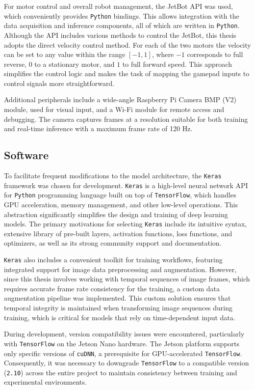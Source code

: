 For motor control and overall robot management, the JetBot API was used, which conveniently provides \texttt{Python} bindings. This allows integration with the data acquisition and inference components, all of which are written in \texttt{Python}. Although the API includes various methods to control the JetBot, this thesis adopts the direct velocity control method. For each of the two motors the velocity can be set to any value within the range \([-1, 1]\), where \(-1\) corresponds to full reverse, \(0\) to a stationary motor, and \(1\) to full forward speed. This approach simplifies the control logic and makes the task of mapping the gamepad inputs to control signals more straightforward.

Additional peripherals include a wide-angle Raspberry Pi Camera BMP (V2) module, used for visual input, and a Wi-Fi module for remote access and debugging. The camera captures frames at a resolution suitable for both training and real-time inference with a maximum frame rate of 120 Hz.

\subsection{Software}

To facilitate frequent modifications to the model architecture, the \texttt{Keras} framework was chosen for development. \texttt{Keras} is a high-level neural network API for \texttt{Python} programming language built on top of \texttt{TensorFlow}, which handles GPU acceleration, memory management, and other low-level operations. This abstraction significantly simplifies the design and training of deep learning models. The primary motivations for selecting \texttt{Keras} include its intuitive syntax, extensive library of pre-built layers, activation functions, loss functions, and optimizers, as well as its strong community support and documentation.

\texttt{Keras} also includes a convenient toolkit for training workflows, featuring integrated support for image data preprocessing and augmentation. However, since this thesis involves working with temporal sequences of image frames, which requires accurate frame rate consistency for the training, a custom data augmentation pipeline was implemented. This custom solution ensures that temporal integrity is maintained when transforming image sequences during training, which is critical for models that rely on time-dependent input data.

During development, version compatibility issues were encountered, particularly with \texttt{TensorFlow} on the Jetson Nano hardware. The Jetson platform supports only specific versions of \texttt{cuDNN}, a prerequisite for GPU-accelerated \texttt{TensorFlow}. Consequently, it was necessary to downgrade \texttt{TensorFlow} to a compatible version (\texttt{2.10}) across the entire project to maintain consistency between training and experimental environments.

